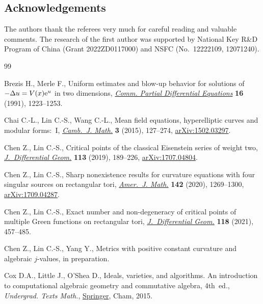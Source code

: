 \documentclass[pdftex]{sigma}
\numberwithin{equation}{section}
\begin{document}
\subsection*{Acknowledgements}

The authors thank the referees very much for careful reading and valuable comments. The research of the first author was supported by National Key R\&D Program of China (Grant 2022ZD0117000) and NSFC (No.~12222109, 12071240).

\begin{thebibliography}{99}
\footnotesize\itemsep=0pt

Brezis H., Merle F., Uniform estimates and blow-up behavior for solutions of
 {$-\Delta u=V(x){\rm e}^u$} in two dimensions, \href{https://doi.org/10.1080/03605309108820797}{\textit{Comm. Partial Differential
 Equations}} \textbf{16} (1991), 1223--1253.

Chai C.-L., Lin C.-S., Wang C.-L., Mean field equations, hyperelliptic curves and
 modular forms:~{I}, \href{https://doi.org/10.4310/CJM.2015.v3.n1.a3}{\textit{Camb.~J. Math.}} \textbf{3} (2015), 127--274,
 \href{https://arxiv.org/abs/1502.03297}{arXiv:1502.03297}.

Chen Z., Lin C.-S., Critical points of the classical {E}isenstein series of
 weight two, \href{https://doi.org/10.4310/jdg/1571882423}{\textit{J.~Differential Geom.}} \textbf{113} (2019), 189--226,
 \href{https://arxiv.org/abs/1707.04804}{arXiv:1707.04804}.

Chen Z., Lin C.-S., Sharp nonexistence results for curvature equations with four
 singular sources on rectangular tori, \href{https://doi.org/10.1353/ajm.2020.0028}{\textit{Amer.~J. Math.}} \textbf{142}
 (2020), 1269--1300, \href{https://arxiv.org/abs/1709.04287}{arXiv:1709.04287}.

Chen Z., Lin C.-S., Exact number and non-degeneracy of critical points of
 multiple {G}reen functions on rectangular tori, \href{https://doi.org/10.4310/jdg/1625860623}{\textit{J.~Differential
 Geom.}} \textbf{118} (2021), 457--485.

Chen Z., Lin C.-S., Yang Y., Metrics with positive constant curvature and
 algebraic $j$-values, {i}n preparation.

Cox D.A., Little J., O'Shea D., Ideals, varieties, and algorithms. {A}n
 introduction to computational algebraic geometry and commutative algebra, 4th~ed., \textit{Undergrad. Texts Math.}, \href{https://doi.org/10.1007/978-3-319-16721-3}{Springer}, Cham, 2015.


\end{thebibliography}
\end{document}
